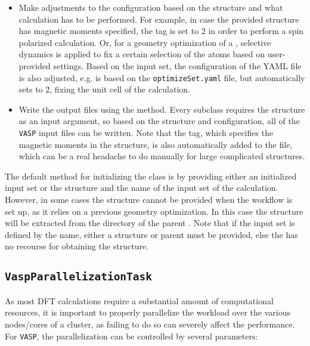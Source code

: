 \begin{refsection}
\begin{itemize}
\item Make adjustments to the configuration based on the structure and what 
calculation has to be performed. For example, in case the provided structure 
has magnetic moments specified, the  tag is set to 2 in order to 
perform a spin polarized calculation. Or, for a geometry optimization of a 
, selective dynamics is applied to fix a 
certain selection of the atoms based on user-provided settings. Based on the 
input set, the configuration of the YAML file is also adjusted, e.g. 
 is based on the \texttt{optimizeSet.yaml} file, but 
automatically sets  to 2, fixing the unit cell of the calculation. 
 
\item Write the output files using the  method. Every 
 subclass requires the structure as an input argument, so based 
on the structure and configuration, all of the \texttt{VASP} input files can 
be written. Note that the  tag, which specifies the magnetic 
moments in the structure, is also automatically added to the  
file, which can be a real headache to do manually for large complicated 
structures. 
 
\end{itemize} 
 
The default method for initializing the  class is by 
providing either an initialized input set or the structure and the name of the 
input set of the calculation. However, in some cases the structure cannot be 
provided when the workflow is set up, as it relies on a previous geometry 
optimization. In this case the structure will be extracted from the directory 
of the parent . Note that if the input set is defined by the 
name, either a structure or parent  must be provided, else the 
 has no recourse for obtaining the structure. 
 
\subsection{\texttt{VaspParallelizationTask}} 
\label{automation:sec-VaspParallelizationTask} 
 
As most DFT calculations require a substantial amount of computational 
resources, it is important to properly parallelize the workload over the 
various nodes/cores of a cluster, as failing to do so can severely affect the 
performance. For \texttt{VASP}, the parallelization can be controlled by 
several parameters: 
 

\end{refsection}
